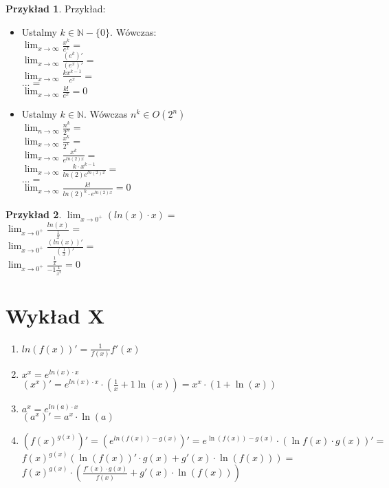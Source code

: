 \documentclass{article}
\theoremstyle{definition}
\theoremstyle{definition}
\theoremstyle{definition}
\newtheorem{pk}{Przykład}[subsection]
\theoremstyle{definition}
\begin{document}
\begin{pk}
    Przykład:\\
    \begin{itemize}
        \item Ustalmy $k\in\mathbb{N} -\{0\}$. Wówczas:\\
        $\lim_{x\rightarrow \infty} \frac{x^k}{e^x}=$\\
        $\lim_{x\rightarrow \infty} \frac{(e^k)'}{(e^x)'}=$\\
        $\lim_{x\rightarrow \infty} \frac{kx^{k-1}}{e^x}=$\\
        $...=$\\
        $\lim_{x\rightarrow \infty} \frac{k!}{e^x}=0$\\
        \item Ustalmy $k\in\mathbb{N}$. Wówczas $n^k\in O(2^n)$\\
        $\lim_{n\rightarrow \infty} \frac{n^k}{2^n}=$\\
        $\lim_{x\rightarrow \infty} \frac{x^k}{2^x}=$\\
        $\lim_{x\rightarrow \infty} \frac{x^k}{e^{ln(2)x}}=$\\
        $\lim_{x\rightarrow \infty} \frac{k\cdot x^{k-1}}{ln(2)e^{ln(2)x}}=$\\
        $...=$\\
        $\lim_{x\rightarrow \infty} \frac{k!}{ln(2)^k\cdot e^{ln(2)x}}=0$ 
    \end{itemize}
\end{pk}

\begin{pk}
    $\lim_{x\rightarrow 0^+} (ln(x)\cdot x) =$\\
    $\lim_{x\rightarrow 0^+} \frac{ln(x)}{\frac{{1}}{x}} =$\\
    $\lim_{x\rightarrow 0^+} \frac{(ln(x))'}{(\frac{1}{x})'} =$\\
    $\lim_{x\rightarrow 0^+} \frac{\frac{{1}}{x}}{-1 \frac{1}{x^2}}=0$
\end{pk}

\section{Wykład X}

\begin{enumerate}
    \item $ln(f(x))'=\frac{1}{f(x)} f'(x)$
    \item $x^x = e^{ln(x)\cdot x}$\\
    $(x^x)' = e^{ln(x)\cdot x} \cdot \left(\frac{1}{x}+1\ln(x)\right)= x^x\cdot(1+\ln(x))$
    \item $a^x=e^{ln(a)\cdot x}$\\
    $(a^x)' = a^x\cdot \ln(a)$
    \item $(f(x)^{g(x)})'=\left(e^{ln(f(x))-g(x)}\right)'=e^{\ln(f(x))-g(x)}\cdot (\ln f(x)\cdot g(x))'=$\\
    $f(x)^{g(x)}(\ln(f(x))'\cdot g(x) + g'(x)\cdot \ln(f(x)))=$\\
    $f(x)^{g(x)} \cdot \left(\frac{f'(x)\cdot g(x)}{f(x)}+g'(x)\cdot \ln(f(x))\right)$
\end{enumerate}
\end{document}
